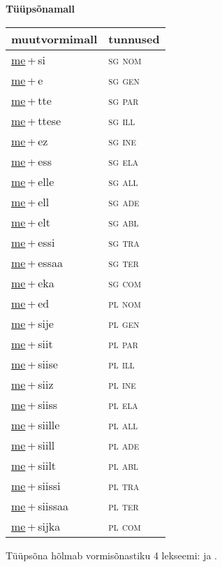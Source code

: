 
\vspace{1.8em}
\begin{minipage}{\textwidth}
\textbf{Tüüpsõnamall \,}\\

\begin{sideways}
\begin{tabular}{l l}
muutvormimall & tunnused \\
\hline
\underline{me}\,+\,si & \textsc{ sg nom } \\
\underline{me}\,+\,e & \textsc{ sg gen } \\
\underline{me}\,+\,tte & \textsc{ sg par } \\
\underline{me}\,+\,ttese & \textsc{ sg ill } \\
\underline{me}\,+\,ez & \textsc{ sg ine } \\
\underline{me}\,+\,ess & \textsc{ sg ela } \\
\underline{me}\,+\,elle & \textsc{ sg all } \\
\underline{me}\,+\,ell & \textsc{ sg ade } \\
\underline{me}\,+\,elt & \textsc{ sg abl } \\
\underline{me}\,+\,essi & \textsc{ sg tra } \\
\underline{me}\,+\,essaa & \textsc{ sg ter } \\
\underline{me}\,+\,eka & \textsc{ sg com } \\
\underline{me}\,+\,ed & \textsc{ pl nom } \\
\underline{me}\,+\,sije & \textsc{ pl gen } \\
\underline{me}\,+\,siit & \textsc{ pl par } \\
\underline{me}\,+\,siise & \textsc{ pl ill } \\
\underline{me}\,+\,siiz & \textsc{ pl ine } \\
\underline{me}\,+\,siiss & \textsc{ pl ela } \\
\underline{me}\,+\,siille & \textsc{ pl all } \\
\underline{me}\,+\,siill & \textsc{ pl ade } \\
\underline{me}\,+\,siilt & \textsc{ pl abl } \\
\underline{me}\,+\,siissi & \textsc{ pl tra } \\
\underline{me}\,+\,siissaa & \textsc{ pl ter } \\
\underline{me}\,+\,sijka & \textsc{ pl com } \\
\end{tabular}
\end{sideways}
\label{tab:tüüpsõnamall-mesi}

\end{minipage}

 
\vspace{1em}
\noindent Tüüpsõna hõlmab vormisõnastiku 4 lekseemi:  ja .

